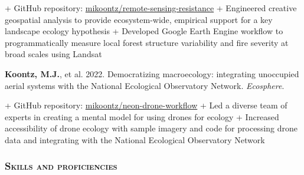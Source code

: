 \documentclass[10pt,english]{article}
\begin{document}
\begin{addmargin}[1ex]{0ex}%
+ GitHub repository: \href{https://github.com/mikoontz/remote-sensing-resistance}{mikoontz/remote-sensing-resistance} \newline 
+ Engineered creative geospatial analysis to provide ecosystem-wide, empirical support for a key landscape ecology hypothesis \newline 
+ Developed Google Earth Engine workflow to programmatically measure local forest structure variability and fire severity at broad scales using Landsat
\end{addmargin}

\vspace{1ex}

\textbf{Koontz, M.J.}, et al. 2022. Democratizing macroecology: integrating unoccupied aerial systems with the National Ecological Observatory Network. \emph{Ecosphere}. 

\begin{addmargin}[1ex]{0ex}%
+ GitHub repository: \href{https://github.com/mikoontz/neon-drone-workflow}{mikoontz/neon-drone-workflow} \newline 
+ Led a diverse team of experts in creating a mental model for using drones for ecology \newline 
+ Increased accessibility of drone ecology with sample imagery and code for processing drone data and integrating with the National Ecological Observatory Network
\end{addmargin}

\vspace{1ex}

% 

\vspace{1ex}
\newpage


\subsubsection*{\textsc{Skills and proficiencies}}
\vspace{-0.5ex}

\setlength{\LTpre}{0pt}
\setlength{\LTpost}{2ex}
\setlength{\extrarowheight}{0.25ex}

\end{document}
